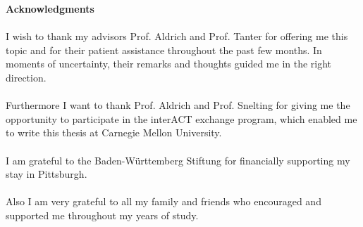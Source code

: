
\vspace*{15\baselineskip}
\textbf{Acknowledgments}\\\\
I wish to thank my advisors Prof. Aldrich and Prof. Tanter for offering me this topic and for their patient assistance throughout the past few months. 
In moments of uncertainty, their remarks and thoughts guided me in the right direction.\\\\
Furthermore I want to thank Prof. Aldrich and Prof. Snelting for giving me the opportunity to participate in the interACT exchange program, which enabled me to write this thesis at Carnegie Mellon University.\\\\
I am grateful to the Baden-Württemberg Stiftung for financially supporting my stay in Pittsburgh. \\\\
Also I am very grateful to all my family and friends who encouraged and supported me throughout my years of study.


